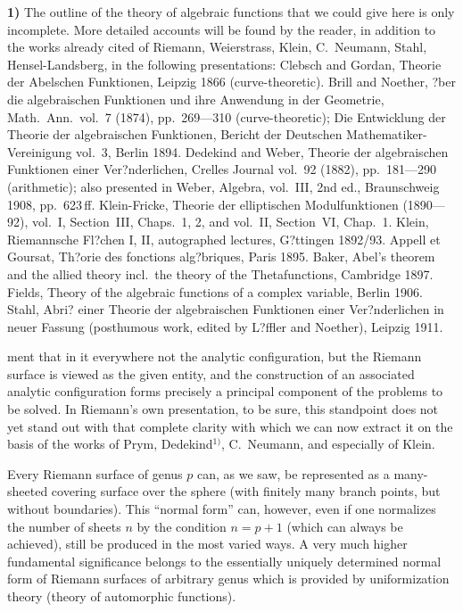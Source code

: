 \documentclass{article}
\begin{document}
\textbf{1)} The outline of the theory of algebraic functions that we could give here is only incomplete. More detailed accounts will be found by the reader, in addition to the works already cited of Riemann, Weierstrass, Klein, C.~Neumann, Stahl, Hensel-Landsberg, in the following presentations: Clebsch and Gordan, Theorie der Abelschen Funktionen, Leipzig 1866 (curve-theoretic). Brill and Noether, ?ber die algebraischen Funktionen und ihre Anwendung in der Geometrie, Math.\ Ann.\ vol.~7 (1874), pp.~269---310 (curve-theoretic); Die Entwicklung der Theorie der algebraischen Funktionen, Bericht der Deutschen Mathematiker-Vereinigung vol.~3, Berlin 1894. Dedekind and Weber, Theorie der algebraischen Funktionen einer Ver?nderlichen, Crelles Journal vol.~92 (1882), pp.~181---290 (arithmetic); also presented in Weber, Algebra, vol.~III, 2nd ed., Braunschweig 1908, pp.~623\,ff. Klein-Fricke, Theorie der elliptischen Modulfunktionen (1890---92), vol.~I, Section~III, Chaps.~1, 2, and vol.~II, Section~VI, Chap.~1. Klein, Riemannsche Fl?chen I, II, autographed lectures, G?ttingen 1892/93. Appell et Goursat, Th?orie des fonctions alg?briques, Paris 1895. Baker, Abel's theorem and the allied theory incl.\ the theory of the Thetafunctions, Cambridge 1897. Fields, Theory of the algebraic functions of a complex variable, Berlin 1906. Stahl, Abri? einer Theorie der algebraischen Funktionen einer Ver?nderlichen in neuer Fassung (posthumous work, edited by L?ffler and Noether), Leipzig 1911.

ment that in it everywhere not the analytic configuration, but the Riemann surface is viewed as the given entity, and the construction of an associated analytic configuration forms precisely a principal component of the problems to be solved. In Riemann's own presentation, to be sure, this standpoint does not yet stand out with that complete clarity with which we can now extract it on the basis of the works of Prym, Dedekind${}^{1)}$, C.~Neumann, and especially of Klein.

Every Riemann surface of genus $p$ can, as we saw, be represented as a many-sheeted covering surface over the sphere (with finitely many branch points, but without boundaries). This ``normal form'' can, however, even if one normalizes the number of sheets $n$ by the condition $n = p + 1$ (which can always be achieved), still be produced in the most varied ways. A very much higher fundamental significance belongs to the essentially uniquely determined normal form of Riemann surfaces of arbitrary genus which is provided by uniformization theory (theory of automorphic functions).
\end{document}
